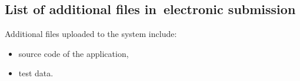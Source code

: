 \documentclass[a4paper,twoside,12pt]{book}
\begin{document}
\begin{appendices} 


 




\chapter*{List of additional files in~electronic submission}

Additional files uploaded to the system include:
\begin{itemize}
\item source code of the application,
\item test data.
\end{itemize}
 
\listoffigures
{}
\listoftables
{}

\end{appendices}
\end{document}
